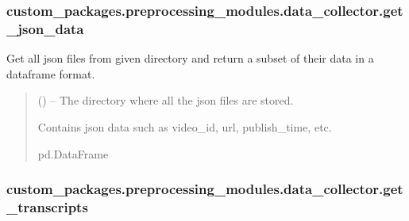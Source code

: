 \documentclass[letterpaper,10pt,english]{sphinxhowto}
\begin{document}
\sphinxstepscope


\subsubsection{custom\_packages.preprocessing\_modules.data\_collector.get\_json\_data}
\label{\detokenize{_autosummary/custom_packages.preprocessing_modules.data_collector.get_json_data:custom-packages-preprocessing-modules-data-collector-get-json-data}}\label{\detokenize{_autosummary/custom_packages.preprocessing_modules.data_collector.get_json_data::doc}}

\begin{fulllineitems}
\label{\detokenize{_autosummary/custom_packages.preprocessing_modules.data_collector.get_json_data:custom_packages.preprocessing_modules.data_collector.get_json_data}}
\pysigstartsignatures
\pysiglinewithargsret
{}
{}
{}
\pysigstopsignatures
\sphinxAtStartPar
Get all json files from given directory and return a subset of their data
in a dataframe format.
\begin{quote}\begin{description}
\sphinxAtStartPar
{} () – The directory where all the json files are stored.

\sphinxAtStartPar
Contains json data such as video\_id, url, publish\_time, etc.

\sphinxAtStartPar
pd.DataFrame

\end{description}\end{quote}

\end{fulllineitems}


\sphinxstepscope


\subsubsection{custom\_packages.preprocessing\_modules.data\_collector.get\_transcripts}
\label{\detokenize{_autosummary/custom_packages.preprocessing_modules.data_collector.get_transcripts:custom-packages-preprocessing-modules-data-collector-get-transcripts}}\label{\detokenize{_autosummary/custom_packages.preprocessing_modules.data_collector.get_transcripts::doc}}
\end{document}
